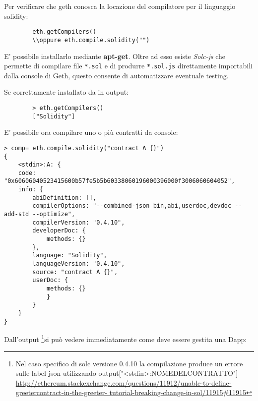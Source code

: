 \begin{appendices}
		Per verificare che geth conosca la locazione del compilatore per il linguaggio solidity:
		
		\begin{lstlisting}
		eth.getCompilers()
		\\oppure eth.compile.solidity("")
		\end{lstlisting}
		
		E' possibile installarlo mediante \textbf{apt-get}. Oltre ad esso esiste \textit{Solc-js} che permette di compilare file \lstinline|*.sol| e di produrre \lstinline|*.sol.js| direttamente importabili dalla console di Geth, questo consente di automatizzare eventuale testing.
		\iffalse
		
		\begin{lstlisting}
		sudo add-apt-repository ppa:ethereum/ethereum
		sudo apt-get update
		sudo apt-get install solc
		which solc
		\end{lstlisting}

		Per settare a runtime il compilatore:
		
		\begin{lstlisting}
		> admin.setSolc("/usr/bin/solc")
		
		"solc, the solidity compiler commandline interface\nVersion: 0.4.10+commit.f0d539ae.Linux.g++\n"
		\end{lstlisting}
		\fi
				
		Se correttamente installato da in output:
		\begin{lstlisting}
		> eth.getCompilers()
		["Solidity"]
		\end{lstlisting}
		
		E' possibile ora compilare uno o più contratti da console:
		
\begin{lstlisting}
> comp= eth.compile.solidity("contract A {}")
{
	<stdin>:A: {
	code: 			"0x60606040523415600b57fe5b5b60338060196000396000f3006060604052",
	info: {
		abiDefinition: [],
		compilerOptions: "--combined-json bin,abi,userdoc,devdoc --add-std --optimize",
		compilerVersion: "0.4.10",
		developerDoc: {
			methods: {}
		},
		language: "Solidity",
		languageVersion: "0.4.10",
		source: "contract A {}",
		userDoc: {
			methods: {}
			}
		}
	}
}
\end{lstlisting}
		
		Dall'output \footnote{Nel caso specifico di solc versione 0.4.10 la compilazione produce un errore sulle label json utilizzando output["<stdin>:NOMEDELCONTRATTO"] \url{http://ethereum.stackexchange.com/questions/11912/unable-to-define-greetercontract-in-the-greeter- tutorial-breaking-change-in-sol/11915\#11915}}si può vedere immediatamente come deve essere gestita una Dapp:
		

\end{appendices}
